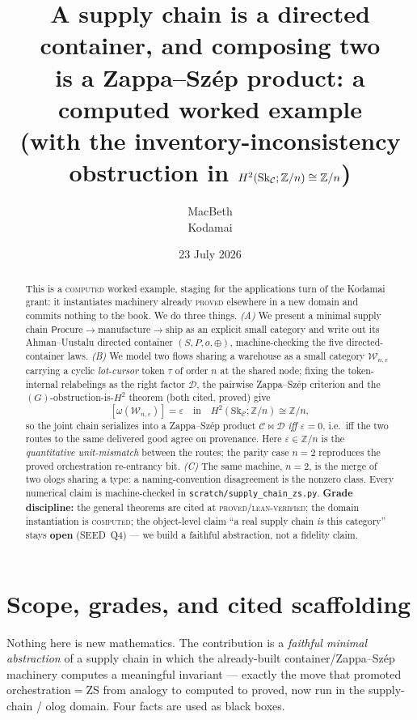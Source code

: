 \documentclass[11pt]{article}
\title{A supply chain is a directed container, and composing two\\
is a Zappa--Sz\'ep product: a computed worked example\\
\large (with the inventory-inconsistency obstruction in $H^2(\Sk_\C;\Zn)\cong\Zn$)}
\author{MacBeth\\\small Kodamai}
\date{23 July 2026}
\theoremstyle{definition}
\newcommand{\C}{\mathcal{C}}
\newcommand{\D}{\mathcal{D}}
\newcommand{\W}{\mathcal{W}}
\newcommand{\Sk}{\mathrm{Sk}}
\newcommand{\Prc}{\mathsf{Pr}}
\newcommand{\Zn}{\mathbb{Z}/n}
\begin{document}
\maketitle

\begin{abstract}
This is a \textsc{computed} worked example, staging for the applications turn of the
Kodamai grant: it instantiates machinery already \textsc{proved} elsewhere in a new
domain and commits nothing to the book. We do three things. \emph{(A)} We present a
minimal supply chain $\Prc\text{ocure}\to\text{manufacture}\to\text{ship}$ as an
explicit small category and write out its Ahman--Uustalu directed container
$(S,P,o,\oplus)$, machine-checking the five directed-container laws. \emph{(B)} We
model two flows sharing a warehouse as a small category $\W_{n,\varepsilon}$ carrying a
cyclic \emph{lot-cursor} token $\tau$ of order $n$ at the shared node; fixing the
token-internal relabelings as the right factor $\D$, the pairwise Zappa--Sz\'ep
criterion and the $(G)$-obstruction-is-$H^2$ theorem (both cited, proved) give
\[
   [\omega(\W_{n,\varepsilon})]=\varepsilon\quad\text{in}\quad
   H^2(\Sk_\C;\Zn)\cong\Zn ,
\]
so the joint chain serializes into a Zappa--Sz\'ep product $\C\bowtie\D$
\emph{iff $\varepsilon=0$}, i.e.\ iff the two routes to the same delivered good agree
on provenance. Here $\varepsilon\in\Zn$ is the \emph{quantitative unit-mismatch}
between the routes; the parity case $n=2$ reproduces the proved orchestration
re-entrancy bit. \emph{(C)} The same machine, $n=2$, is the merge of two ologs sharing
a type: a naming-convention disagreement is the nonzero class. Every numerical claim
is machine-checked in \texttt{scratch/supply\_chain\_zs.py}. \textbf{Grade discipline:}
the general theorems are cited at \textsc{proved}/\textsc{lean-verified}; the
domain instantiation is \textsc{computed}; the object-level claim ``a real supply chain
\emph{is} this category'' stays \textbf{open} (SEED~Q4) --- we build a faithful
abstraction, not a fidelity claim.
\end{abstract}

\section{Scope, grades, and cited scaffolding}\label{sec:scope}

Nothing here is new mathematics. The contribution is a \emph{faithful minimal
abstraction} of a supply chain in which the already-built container/Zappa--Sz\'ep
machinery computes a meaningful invariant --- exactly the move that promoted
orchestration$=$ZS from analogy to computed to proved, now run in the
supply-chain / olog domain. Four facts are used as black boxes.
\end{document}
